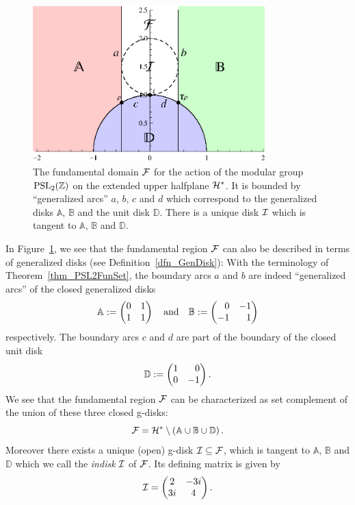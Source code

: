 \begin{remark}
\label{rem_PSL2FunDomGenDisks}
\begin{figure}
\centering
\includegraphics[width=0.8\textwidth]{figures/fundom}
\caption{The fundamental domain $\mathcal{F}$ for the action of the modular group $\operatorname{PSL}_{2}(\mathbb{Z})$ on the extended upper halfplane $\mathcal{H}^\ast$. It is bounded by ``generalized arcs'' $a$, $b$, $c$ and $d$ which correspond to the generalized disks $\mathbb{A}$, $\mathbb{B}$ and the unit disk $\mathbb{D}$. There is a unique disk $\mathcal{I}$ which is tangent to $\mathbb{A}$, $\mathbb{B}$ and $\mathbb{D}$.}
\label{fig_PSL2FunDom}
\end{figure}
In Figure~\ref{fig_PSL2FunDom}, we see that the fundamental region $\mathcal{F}$ can also be described in terms of generalized disks (see Definition~\ref{dfn_GenDisk}): With the terminology of Theorem~\ref{thm_PSL2FunSet}, the boundary arcs $a$ and $b$ are indeed ``generalized arcs'' of the closed generalized disks
\begin{equation*}
\mathbb{A} := \begin{pmatrix}0 & 1 \\ 1 & 1\end{pmatrix} \quad \text{and} \quad \mathbb{B} := \begin{pmatrix}\phantom{+}0 & -1 \\ -1 & \phantom{+}1\end{pmatrix}
\end{equation*}
respectively. The boundary arcs $c$ and $d$ are part of the boundary of the closed unit disk
\begin{equation*}
\mathbb{D} := \begin{pmatrix}1 & \phantom{+}0 \\ 0 & -1\end{pmatrix}.
\end{equation*}
We see that the fundamental region $\mathcal{F}$ can be characterized as set complement of the union of these three closed g-disks:
\begin{equation*}
\mathcal{F} = \mathcal{H}^\ast \setminus \left(\mathbb{A} \cup \mathbb{B} \cup \mathbb{D}\right).
\end{equation*}
Moreover there exists a unique (open) g-disk $\mathcal{I} \subseteq \mathcal{F}$, which is tangent to $\mathbb{A}$, $\mathbb{B}$ and $\mathbb{D}$ which we call the \emph{indisk} $\mathcal{I}$ of $\mathcal{F}$. Its defining matrix is given by
\begin{equation*}
\mathcal{I} = \begin{pmatrix}2 & -3i \\ 3i & 4\end{pmatrix}.
\end{equation*}
\end{remark}


